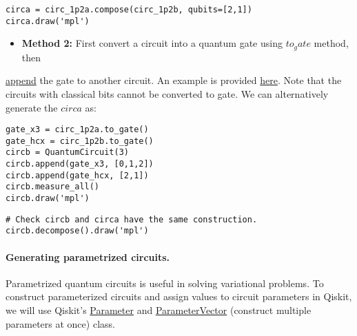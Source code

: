 \documentclass[%
oneside,                 %
final,                   %
10pt]{article}
\begin{document}
\begin{verbatim}
circa = circ_1p2a.compose(circ_1p2b, qubits=[2,1])
circa.draw('mpl')

\end{verbatim}


\begin{itemize}
\item \textbf{Method 2:} First convert a circuit into a quantum gate using \href{{https://qiskit.org/documentation/stubs/qiskit.circuit.QuantumCircuit.to_gate.html}}{$to_gate$} method, then 
\end{itemize}

\noindent
\href{{https://qiskit.org/documentation/stubs/qiskit.circuit.QuantumCircuit.append.html#qiskit.circuit.QuantumCircuit.append}}{append} the gate to another circuit.
An example is provided \href{{https://www.youtube.com/watch?v=krhPpzkT_z4}}{here}.
Note that the circuits with classical bits cannot be converted to gate. We can alternatively generate the $circa$ as:









\begin{verbatim}
gate_x3 = circ_1p2a.to_gate()
gate_hcx = circ_1p2b.to_gate()
circb = QuantumCircuit(3)
circb.append(gate_x3, [0,1,2])
circb.append(gate_hcx, [2,1])
circb.measure_all()  
circb.draw('mpl')

\end{verbatim}





\begin{verbatim}
# Check circb and circa have the same construction.
circb.decompose().draw('mpl')

\end{verbatim}


\paragraph{Generating parametrized circuits.}
Parametrized quantum circuits is useful in solving variational problems. To construct parameterized circuits and assign values to circuit parameters in Qiskit, we will use Qiskit's \href{{https://qiskit.org/documentation/stubs/qiskit.circuit.Parameter.html}}{Parameter} and \href{{https://qiskit.org/documentation/stubs/qiskit.circuit.ParameterVector.html}}{ParameterVector} (construct multiple parameters at once) class.
\end{document}
